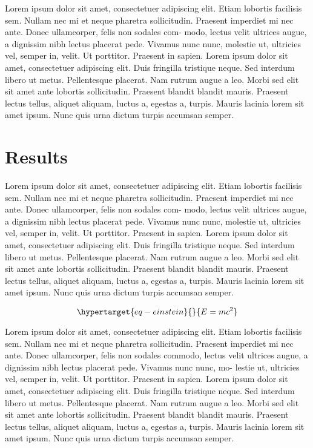 \documentclass[
  9pt,
  twocolumn,
  twoside]{turbo}%
\begin{document}
Lorem ipsum dolor sit amet, consectetuer adipiscing elit. Etiam lobortis
facilisis sem. Nullam nec mi et neque pharetra sollicitudin. Praesent
imperdiet mi nec ante. Donec ullamcorper, felis non sodales com- modo,
lectus velit ultrices augue, a dignissim nibh lectus placerat pede.
Vivamus nunc nunc, molestie ut, ultricies vel, semper in, velit. Ut
porttitor. Praesent in sapien. Lorem ipsum dolor sit amet, consectetuer
adipiscing elit. Duis fringilla tristique neque. Sed interdum libero ut
metus. Pellentesque placerat. Nam rutrum augue a leo. Morbi sed elit sit
amet ante lobortis sollicitudin. Praesent blandit blandit mauris.
Praesent lectus tellus, aliquet aliquam, luctus a, egestas a, turpis.
Mauris lacinia lorem sit amet ipsum. Nunc quis urna dictum turpis
accumsan semper.

\hypertarget{sec-results}{%
\section{Results}\label{sec-results}}

Lorem ipsum dolor sit amet, consectetuer adipiscing elit. Etiam lobortis
facilisis sem. Nullam nec mi et neque pharetra sollicitudin. Praesent
imperdiet mi nec ante. Donec ullamcorper, felis non sodales com- modo,
lectus velit ultrices augue, a dignissim nibh lectus placerat pede.
Vivamus nunc nunc, molestie ut, ultricies vel, semper in, velit. Ut
porttitor. Praesent in sapien. Lorem ipsum dolor sit amet, consectetuer
adipiscing elit. Duis fringilla tristique neque. Sed interdum libero ut
metus. Pellentesque placerat. Nam rutrum augue a leo. Morbi sed elit sit
amet ante lobortis sollicitudin. Praesent blandit blandit mauris.
Praesent lectus tellus, aliquet aliquam, luctus a, egestas a, turpis.
Mauris lacinia lorem sit amet ipsum. Nunc quis urna dictum turpis
accumsan semper.

\begin{equation}\protect\hypertarget{eq-einstein}{}{E = m c^2}\label{eq-einstein}\end{equation}

Lorem ipsum dolor sit amet, consectetuer adipiscing elit. Etiam lobortis
facilisis sem. Nullam nec mi et neque pharetra sollicitudin. Praesent
imperdiet mi nec ante. Donec ullamcorper, felis non sodales commodo,
lectus velit ultrices augue, a dignissim nibh lectus placerat pede.
Vivamus nunc nunc, mo- lestie ut, ultricies vel, semper in, velit. Ut
porttitor. Praesent in sapien. Lorem ipsum dolor sit amet, consectetuer
adipiscing elit. Duis fringilla tristique neque. Sed interdum libero ut
metus. Pellentesque placerat. Nam rutrum augue a leo. Morbi sed elit sit
amet ante lobortis sollicitudin. Praesent blandit blandit mauris.
Praesent lectus tellus, aliquet aliquam, luctus a, egestas a, turpis.
Mauris lacinia lorem sit amet ipsum. Nunc quis urna dictum turpis
accumsan semper.
\end{document}
